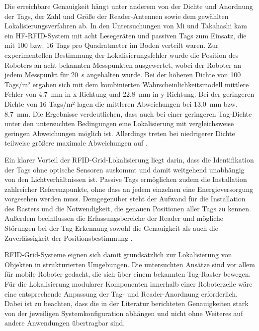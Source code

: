 Die erreichbare Genauigkeit hängt unter anderem von der Dichte und Anordnung der Tags, der Zahl und Größe der Reader-Antennen sowie dem gewählten Lokalisierungsverfahren ab. In den Untersuchungen von Mi und Takahashi kam ein HF-RFID-System mit acht Lesegeräten und passiven Tags zum Einsatz, die mit 100 bzw. 16 Tags pro Quadratmeter im Boden verteilt waren. Zur experimentellen Bestimmung der Lokalisierungsfehler
wurde die Position des Roboters an acht bekannten Messpunkten ausgewertet, wobei der Roboter an jedem Messpunkt für \SI{20}{\second} angehalten wurde. Bei der höheren Dichte von 100 Tags/m² ergaben sich mit dem kombinierten Wahrscheinlichkeitsmodell mittlere Fehler von \SI{4,7}{\milli\metre} in x-Richtung und \SI{22,8}{\milli\metre} in y-Richtung. Bei der geringeren Dichte von 16 Tags/m² lagen die mittleren Abweichungen bei \SI{13,0}{\milli\metre} bzw. \SI{8,7}{\milli\metre}. Die Ergebnisse verdeutlichen, dass auch bei einer geringeren Tag-Dichte unter den untersuchten Bedingungen eine Lokalisierung mit vergleichsweise geringen Abweichungen möglich ist. Allerdings treten bei niedrigerer Dichte teilweise größere maximale Abweichungen auf \cite{MiTakahashi2016}.

Ein klarer Vorteil der RFID-Grid-Lokalisierung liegt darin, dass die Identifikation der Tags ohne optische Sensoren auskommt und damit weitgehend unabhängig von den Lichtverhältnissen ist. Passive Tags ermöglichen zudem die Installation zahlreicher Referenzpunkte, ohne dass an jedem einzelnen eine Energieversorgung vorgesehen werden muss. Demgegenüber steht der Aufwand für die Installation des Rasters und die Notwendigkeit, die genauen Positionen aller Tags zu kennen. Außerdem beeinflussen die Erfassungsbereiche der Reader und mögliche Störungen bei der Tag-Erkennung sowohl die Genauigkeit als auch die Zuverlässigkeit der Positionsbestimmung \cite{MiTakahashi2016}.

RFID-Grid-Systeme eignen sich damit grundsätzlich zur Lokalisierung von Objekten in strukturierten Umgebungen. Die untersuchten Ansätze sind vor allem für mobile Roboter gedacht, die sich über einem bekannten Tag-Raster bewegen. Für die Lokalisierung modularer Komponenten innerhalb einer Roboterzelle wäre eine entsprechende Anpassung der Tag- und Reader-Anordnung erforderlich. Dabei ist zu beachten, dass die in der Literatur berichteten Genauigkeiten stark von der jeweiligen Systemkonfiguration abhängen und nicht ohne Weiteres auf andere Anwendungen übertragbar sind.

